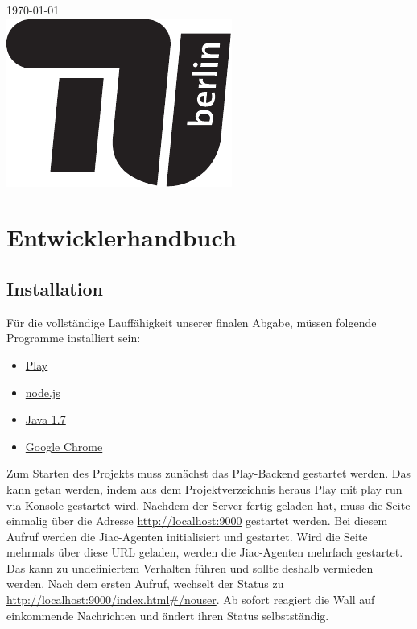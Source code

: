 \documentclass[10pt,a4paper]{report}
\newcommand{\code}[1]{{\fontfamily{cmvtt}\selectfont #1}}
\begin{document}
\begin{titlepage}

{\large \today}\\[3cm] %

\includegraphics{TU_Logo}\\[1cm] %

\vfill %
\end{titlepage}



\tableofcontents


\chapter{Entwicklerhandbuch}
	\section{Installation}
	Für die vollständige Lauffähigkeit unserer finalen Abgabe, müssen folgende Programme installiert sein:
	\begin{itemize}
		\item \href{http://www.playframework.com/}{Play}
		\item \href{http://nodejs.org/}{node.js} 
		\item \href{http://www.oracle.com/technetwork/java/javase/downloads/java-se-jre-7-download-432155.html}{Java 1.7} 
		\item \href{http://www.google.de/intl/de/chrome/browser/}{Google Chrome}
	\end{itemize}
	Zum Starten des Projekts muss zunächst das Play-Backend gestartet werden. Das kann getan werden, indem aus dem Projektverzeichnis heraus Play mit
	\code{play run} via Konsole gestartet wird. Nachdem der Server fertig geladen hat, muss die Seite einmalig über die Adresse \url{http://localhost:9000} gestartet werden.
	Bei diesem Aufruf werden die Jiac-Agenten initialisiert und gestartet. Wird die Seite mehrmals über diese URL geladen, werden die Jiac-Agenten mehrfach gestartet. Das kann zu undefiniertem Verhalten führen und sollte deshalb vermieden werden. Nach dem ersten Aufruf, wechselt der Status zu \url{http://localhost:9000/index.html\#/nouser}. Ab sofort reagiert die Wall auf einkommende Nachrichten und ändert ihren Status selbstständig.
\end{document}
